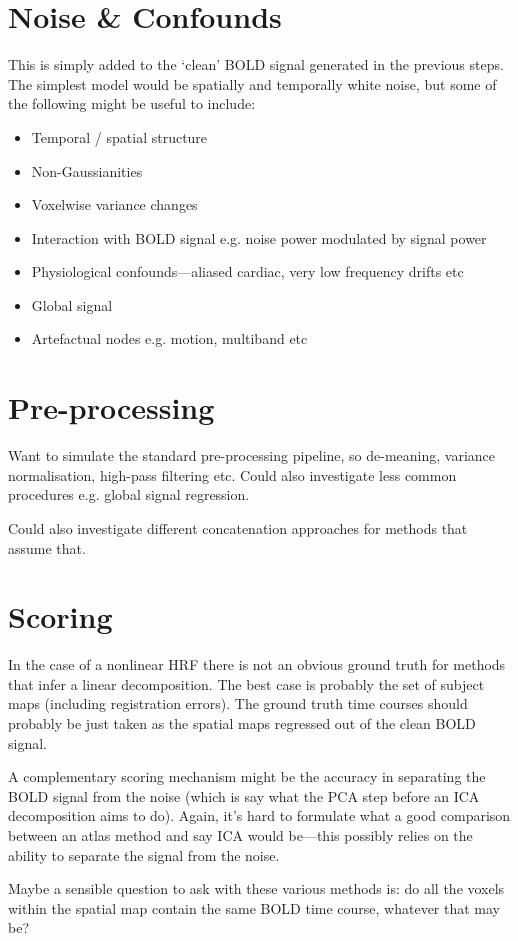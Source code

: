\documentclass[a4paper, 12pt]{article}
\begin{document}
\section{Noise \& Confounds}
\label{sec:Noise}
This is simply added to the `clean' BOLD signal generated in the previous steps. 
The simplest model would be spatially and temporally white noise, but some of the following might be useful to include:
\begin{itemize}
\item{Temporal / spatial structure}
\item{Non-Gaussianities}
\item{Voxelwise variance changes}
\item{Interaction with BOLD signal e.g. noise power modulated by signal power}
\item{Physiological confounds---aliased cardiac, very low frequency drifts etc}
\item{Global signal}
\item{Artefactual nodes e.g. motion, multiband etc}
\end{itemize}


\section{Pre-processing}
\label{sec:Preprocessing}
Want to simulate the standard pre-processing pipeline, so de-meaning, variance normalisation, high-pass filtering etc. 
Could also investigate less common procedures e.g. global signal regression.

Could also investigate different concatenation approaches for methods that assume that.


\section{Scoring}
\label{sec:Accuracy}
In the case of a nonlinear HRF there is not an obvious ground truth for methods that infer a linear decomposition. 
The best case is probably the set of subject maps (including registration errors).
The ground truth time courses should probably be just taken as the spatial maps regressed out of the clean BOLD signal.

A complementary scoring mechanism might be the accuracy in separating the BOLD signal from the noise (which is say what the PCA step before an ICA decomposition aims to do).
Again, it's hard to formulate what a good comparison between an atlas method and say ICA would be---this possibly relies on the ability to separate the signal from the noise. 

Maybe a sensible question to ask with these various methods is: do all the voxels within the spatial map contain the same BOLD time course, whatever that may be?


\printbibliography

\end{document}
